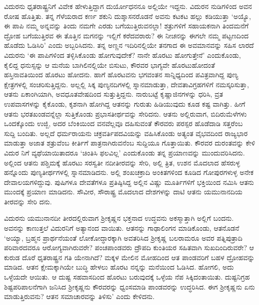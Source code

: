 ವಿದುರನು ಧೃತರಾಷ್ಟ್ರನಿಗೆ ವಿವೇಕ ಹೇಳುತ್ತಿದ್ದಾಗ ದುರ್ಯೋಧನನೂ ಅಲ್ಲಿಯೇ ಇದ್ದನು. ವಿದುರನ ನುಡಿಗಳಿಂದ ಅವನ ರೋಷ ಹೊತ್ತಿತು. ತನ್ನ ಗೆಳೆಯರಾದ ಕರ್ಣ ಶಕುನಿ ದುಶ್ಶಾಸನರೊಡನೆ ಅವನು ಕಟಕಟ ಹಲ್ಲು ಕಡಿಯುತ್ತಾ ‘ಅಯ್ಯೊ, ಈ ಪಾಪಿ ನಮ್ಮ ಅನ್ನವನ್ನು ತಿಂದು ನಮಗೇ ಎರಡು ಬಗೆಯುತ್ತಿರುವನಲ್ಲಾ! ಶತ್ರುಗಳಿಗೆ ಸಹಾಯಕನಾಗಿ ತಿಂದಮನೆಗೆ ದ್ರೋಹ ಬಗೆಯುತ್ತಿರವ ಈ ತೊತ್ತಿನ ಮಗನನ್ನು ಇಲ್ಲಿಗೆ ಕರೆದವರಾರು? ಈ ನೀಚನನ್ನು ಈಗಲೇ ನಮ್ಮ ಪಟ್ಟಣದಿಂದ ಹೊಡೆದು ಓಡಿಸಿರಿ’ ಎಂದು ಅಬ್ಬರಿಸಿದನು. ತನ್ನ ಅಣ್ಣನ ಇದಿರಿನಲ್ಲಿಯೇ ತನಗಾದ ಈ ಅವಮಾನವನ್ನು ಸಹಿಸ ಲಾರದೆ ವಿದುರನು ‘ಈ ಪಾಪಿಗಳಿಂದ ತಳ್ಳಿಸಿಕೊಂಡು ಹೋಗುವುದೇಕೆ? ನಾನೇ ಹೊರಟು ಹೋಗುತ್ತೇನೆ’ ಎಂದುಕೊಂಡು, ಕೈಲಿದ್ದ ಧನುಸ್ಸನ್ನು ಆ ಮನೆಯ ಬಾಗಿಲಿನಲ್ಲಿಯೇ ಬಿಸುಟು, ಕೌರವರ ಭಾಗ್ಯವೇ ಹೊರಟುಹೋದಂತೆ ಹಸ್ತಿನಾವತಿಯಿಂದ ಹೊರಟು ಹೋದನು. ಹಾಗೆ ಹೊರಟವನು ಭಗವಂತನ ಸಾನ್ನಿಧ್ಯದಿಂದ ಪವಿತ್ರವಾಗಿದ್ದ ಪುಣ್ಯ ಕ್ಷೇತ್ರಗಳಲ್ಲಿ ಸಂಚರಿಸುತ್ತಿದ್ದನು. ಅಲ್ಲಲ್ಲಿ ಸಿಕ್ಕ ಪುಣ್ಯನದಿಗಳಲ್ಲಿ ಸ್ನಾನಮಾಡುತ್ತಾ, ದೇವತಾವಿಗ್ರಹಗಳಿಗೆ ನಮಸ್ಕರಿಸುತ್ತಾ, ಆತನು ಏಕಾಂಗಿಯಾಗಿ, ಅವಧೂತವೇಷದಿಂದ ಸುತ್ತುತ್ತಿದ್ದನು. ನಾರುಬಟ್ಟೆ ಕೃಷ್ಣಾಜಿನಗಳನ್ನು ಧರಿಸಿ, ವ್ರತ ಉಪವಾಸಗಳನ್ನು ಕೈಕೊಂಡು, ಕೃಶನಾಗಿ ಹೋಗಿದ್ದ ಆತನನ್ನು ಗುರುತು ಹಿಡಿಯುವುದು ಕೂಡ ಕಷ್ಟ ವಾಗಿತ್ತು. ಹೀಗೆ ಆತನು ಭರತಖಂಡವನ್ನೆಲ್ಲಾ ಸುತ್ತಿಕೊಂಡು ಪ್ರಭಾಸತೀರ್ಥವನ್ನು ಸೇರಿದನು. ಆತನು ಅಲ್ಲಿರುವಾಗ, ಬಿದಿರುಮೆಳೆಗಳು ಒಂದಕ್ಕೊಂದು ಉಜ್ಜಿ, ಅದರ ಬೆಂಕಿಯಿಂದ ವನವೆಲ್ಲವೂ ದಹಿಸುವಂತೆ ಕೌರವರು ಪರಸ್ಪರ ಹೊಡೆದಾಡಿ ಸತ್ತರೆಂಬ ಸುದ್ದಿ ಬಂದಿತು. ಅಲ್ಲದೆ ಧರ್ಮರಾಯನು ಚಕ್ರವರ್ತಿಪದವಿಯನ್ನು ವಹಿಸಿಕೊಂಡು ಅತ್ಯಂತ ವೈಭವದಿಂದ ರಾಜ್ಯಭಾರ ಮಾಡುತ್ತಾ ಅಜಾತ ಶತ್ರುವೆಂಬ ಕೀರ್ತಿಗೆ ಪಾತ್ರನಾಗಿರುವನೆಂಬ ಸುದ್ದಿಯೂ ಗೊತ್ತಾಯಿತು. ಕೌರವರ ದುರಂತವನ್ನು ಕೇಳಿ ವಿದುರ ನಿಗೆ ವ್ಯಥೆಯಾಯಿತಾದರೂ ‘ಚಿಂತಿಸಿ ಫಲವಿಲ್ಲ’ ಎಂದುಕೊಂಡು ತನ್ನ ಪ್ರಯಾಣವನ್ನು ಮುಂದುವರಿಸಿದನು. ಅಲ್ಲಿಂದ ಆತನು ಪಶ್ಚಿಮಕ್ಕೆ ಹೊರಟು ಸರಸ್ವತೀ ನದೀತೀರವನ್ನು ಸೇರಿ, ಅಲ್ಲಿ ತ್ರಿತ, ಉಶನ ಮೊದಲಾದ ಹೆಸರುಳ್ಳ ಹನ್ನೊಂದು ಪುಣ್ಯತೀರ್ಥಗಳಲ್ಲಿ ಸ್ನಾನಮಾಡಿದನು. ಅಲ್ಲಿ ಶಂಖಚಕ್ರಾದಿ ಅಂಕಿತಗಳಿಂದ ಕೂಡಿದ ಗೋಪುರಗಳುಳ್ಳ ಅನೇಕ ದೇವಾಲಯಗಳಿದ್ದುವು. ಪುಷಿಗಳೂ ದೇವತೆಗಳೂ ಪ್ರತಿಷ್ಠಿಸಿದ್ದ ಅಲ್ಲಿನ ವಿಷ್ಣು ಮೂರ್ತಿಗಳಿಗೆ ಭಕ್ತಿಯಿಂದ ನಮಿಸಿ ಆತನು ಮುಂದಕ್ಕೆ ಪ್ರಯಾಣ ಮಾಡಿದನು. ಸೌವೀರ, ಸೌರಾಷ್ಟ್ರ ಮೊದಲಾದ ದೇಶಗಳನ್ನು ದಾಟಿ ಆತನು ಯಮುನಾನದಿಯ ತೀರವನ್ನು ಸೇರಿ ದನು.

ವಿದುರನು ಯಮುನಾನದೀ ತೀರದಲ್ಲಿರುವಾಗ ಶ್ರೀಕೃಷ್ಣನ ಭಕ್ತನಾದ ಉದ್ಧವನು ಅಕಸ್ಮಾತ್ತಾಗಿ ಅಲ್ಲಿಗೆ ಬಂದನು. ಅವನನ್ನು ಕಾಣುತ್ತಲೆ ವಿದುರನಿಗೆ ಅತ್ಯಾನಂದ ವಾಯಿತು. ಆತನನ್ನು ಗಾಢಾಲಿಂಗನ ಮಾಡಿಕೊಂಡು, ಆತನೊಡನೆ ‘ಅಯ್ಯಾ, ಬ್ರಹ್ಮನ ಪ್ರಾರ್ಥನೆಯಂತೆ ಲೋಕೋದ್ಧಾರಕ್ಕಾಗಿ ಅವತರಿಸಿದ ಶ್ರೀಕೃಷ್ಣ ಬಲರಾಮರೂ ಅವರ ಪತ್ನಿಪುತ್ರಾದಿ ಪರಿವಾರದವರೂ ಆರೋಗ್ಯವಾಗಿರುವರೇ? ಪಂಚಪಾಂಡವರು ದ್ರೌಪದಿ ಕುಂತಿಯರ ಸಹಿತವಾಗಿ ಸುಖದಿಂದಿರುವರೇ? ಆ ಕುರುಡ ದೊರೆ ಧೃತರಾಷ್ಟ್ರನ ಗತಿ ಯೇನಾಗಿದೆ? ಮಕ್ಕಳ ಮೇಲಿನ ಮೋಹದಿಂದ ಆತ ಪಾಂಡವರಿಗೆ ಬಹಳ ದ್ರೋಹವನ್ನು ಮಾಡಿದ. ಆತನ ಕ್ಷೇಮಕ್ಕಾಗಿಯೇ ಬುದ್ಧಿ ಹೇಳಲು ಹೊರಟ ನನ್ನನ್ನು ಮನೆಯಿಂದ ಓಡಿಸಿದ. ಹೋಗಲಿ, ಅದು ಒಳ್ಳೆಯದೇ ಆಯಿತು. ಆ ದುಷ್ಟ ಸಹವಾಸದಿಂದ ಹೊರಟು ಬರುವುದಕ್ಕೆ ಒಳ್ಳೆಯ ನೆಪ ಸಿಕ್ಕಿದಂತಾಯಿತು. ದುಷ್ಟನಿಗ್ರಹ ಶಿಷ್ಟಪರಿಪಾಲನೆಗಾಗಿ ಜನಿಸಿದ ಶ್ರೀಕೃಷ್ಣನು ಕೌರವರನ್ನು ಧ್ವಂಸಮಾಡಿ ಪಾಂಡವರನ್ನು ಉದ್ಧರಿಸಿದ. ಈಗ ಶ್ರೀಕೃಷ್ಣನು ಏನು ಮಾಡುತ್ತಿರುವನು? ಆತನ ಸಮಾಚಾರವನ್ನು ತಿಳಿಸು’ ಎಂದು ಕೇಳಿದನು.

